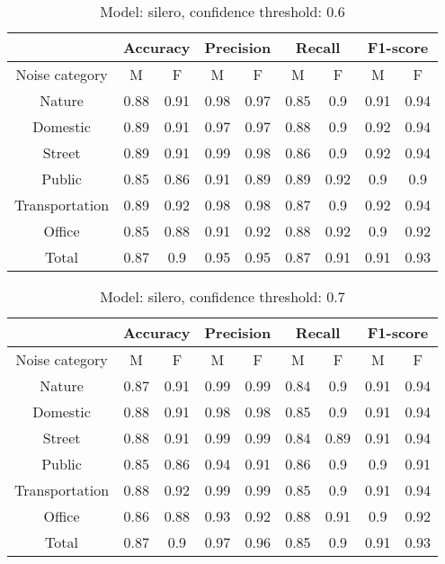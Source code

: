 \documentclass[../main.tex]{subfiles}
\begin{document}
    \begin{table}[H]
    \centering
    \small
    \begin{tabular}{ |c|c|c|c|c|c|c|c|c| }
    \hline
     &\multicolumn{2}{|c|}{Accuracy}&\multicolumn{2}{|c|}{Precision}&\multicolumn{2}{|c|}{Recall}&\multicolumn{2}{|c|}{F1-score} \\ 
    \hline
    Noise category & M & F & M & F & M & F & M & F \\ 
    \hline
    Nature & 0.88 & 0.91 & 0.98 & 0.97 & 0.85 & 0.9 & 0.91 & 0.94 \\ 
    Domestic & 0.89 & 0.91 & 0.97 & 0.97 & 0.88 & 0.9 & 0.92 & 0.94 \\ 
    Street & 0.89 & 0.91 & 0.99 & 0.98 & 0.86 & 0.9 & 0.92 & 0.94 \\ 
    Public & 0.85 & 0.86 & 0.91 & 0.89 & 0.89 & 0.92 & 0.9 & 0.9 \\ 
    Transportation & 0.89 & 0.92 & 0.98 & 0.98 & 0.87 & 0.9 & 0.92 & 0.94 \\ 
    Office & 0.85 & 0.88 & 0.91 & 0.92 & 0.88 & 0.92 & 0.9 & 0.92 \\ 
    Total & 0.87 & 0.9 & 0.95 & 0.95 & 0.87 & 0.91 & 0.91 & 0.93 \\ 
    \hline
    \end{tabular}
    \caption{Model: silero, confidence threshold: 0.6}
    \end{table}
    
    \begin{table}[H]
    \centering
    \small
    \begin{tabular}{ |c|c|c|c|c|c|c|c|c| }
    \hline
     &\multicolumn{2}{|c|}{Accuracy}&\multicolumn{2}{|c|}{Precision}&\multicolumn{2}{|c|}{Recall}&\multicolumn{2}{|c|}{F1-score} \\ 
    \hline
    Noise category & M & F & M & F & M & F & M & F \\ 
    \hline
    Nature & 0.87 & 0.91 & 0.99 & 0.99 & 0.84 & 0.9 & 0.91 & 0.94 \\ 
    Domestic & 0.88 & 0.91 & 0.98 & 0.98 & 0.85 & 0.9 & 0.91 & 0.94 \\ 
    Street & 0.88 & 0.91 & 0.99 & 0.99 & 0.84 & 0.89 & 0.91 & 0.94 \\ 
    Public & 0.85 & 0.86 & 0.94 & 0.91 & 0.86 & 0.9 & 0.9 & 0.91 \\ 
    Transportation & 0.88 & 0.92 & 0.99 & 0.99 & 0.85 & 0.9 & 0.91 & 0.94 \\ 
    Office & 0.86 & 0.88 & 0.93 & 0.92 & 0.88 & 0.91 & 0.9 & 0.92 \\ 
    Total & 0.87 & 0.9 & 0.97 & 0.96 & 0.85 & 0.9 & 0.91 & 0.93 \\ 
    \hline
    \end{tabular}
    \caption{Model: silero, confidence threshold: 0.7}
    \end{table}
    
\end{document}
